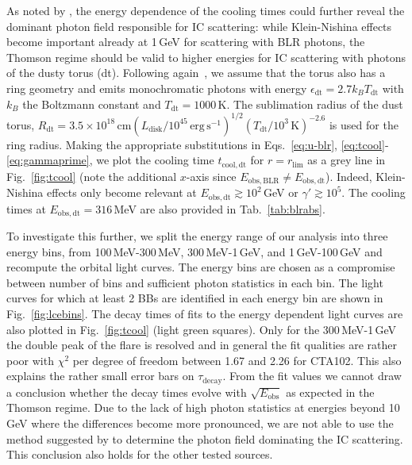 \documentclass[twocolumn,linenumbers]{aastex62}
\begin{document}
  
As noted by \citet{2012ApJ...758L..15D}, the energy dependence of the cooling times could  further reveal the dominant photon field responsible for IC scattering: while Klein-Nishina effects become important already at 1\,GeV for scattering with BLR photons, the Thomson regime should be valid to higher energies for IC scattering with photons of the dusty torus (dt). 
Following again~\citet{finke2016}, we assume that the torus also has a ring geometry and emits monochromatic photons with energy $\epsilon_\mathrm{dt} = 2.7 k_B T_\mathrm{dt}$ with $k_B$ the Boltzmann constant and $T_\mathrm{dt} = 1000\,$K. 
The sublimation radius of the dust torus, $R_\mathrm{dt} = 3.5\times10^{18}\,\mathrm{cm}(L_\mathrm{disk}/10^{45}\,\mathrm{erg}\,\mathrm{s}^{-1})^{1/2}(T_\mathrm{dt}/10^3\,\mathrm{K})^{-2.6}$ is used for the ring radius. 
Making the appropriate substitutions in Eqs.~\ref{eq:u-blr}, \ref{eq:tcool}-\ref{eq:gammaprime}, we plot the cooling time $t_\mathrm{cool,dt}$ for $r = r_\mathrm{lim}$ as a grey line in Fig.~\ref{fig:tcool} (note the additional $x$-axis since $E_\mathrm{obs, BLR} \neq E_\mathrm{obs,dt}$). 
Indeed, Klein-Nishina effects only become relevant at $E_\mathrm{obs,dt} \gtrsim 10^2\,$GeV or $\gamma' \gtrsim 10^5$. The cooling times at $E_\mathrm{obs,dt} = 316\,$MeV are also provided in Tab.~\ref{tab:blrabs}.

To investigate this further, we split the energy range of our analysis into three energy bins, 
 from 100\,MeV-300\,MeV, 300\,MeV-1\,GeV, and 1\,GeV-100\,GeV and recompute the orbital light curves.
The energy bins are chosen as a compromise between number of bins and sufficient photon statistics in each bin. 
The light curves for which at least 2 BBs are identified in each energy bin are shown in Fig.~\ref{fig:lcebins}.
The decay times of fits to the energy dependent light curves are also plotted in Fig.~\ref{fig:tcool} (light green squares). Only for the 300\,MeV-1\,GeV the double peak of the flare is resolved and in general the fit qualities are rather poor with $\chi^2$ per degree of freedom between 1.67 and 2.26 for CTA102. This also explains the rather small error bars on $\tau_\mathrm{decay}$. 
From the fit values we cannot draw a conclusion whether the decay times evolve with $\sqrt{E_\mathrm{obs}}$ as expected in the Thomson regime.
Due to the lack of high photon statistics at energies beyond 10\,GeV where the differences become more pronounced, we are not able to use the method suggested by \citet{2012ApJ...758L..15D} to determine the photon field dominating the IC scattering. 
This conclusion also holds for the other tested sources. 
\end{document}

